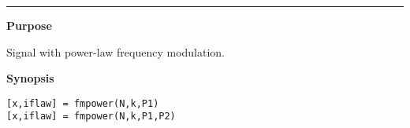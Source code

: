 


\hspace*{-1.6cm}{\Large \bf fmpower}

\vspace*{-.4cm}
\hspace*{-1.6cm}\rule[0in]{16.5cm}{.02cm}
\vspace*{.2cm}



{\bf \large {}\selectfont Purpose}\\
\hspace*{1.5cm}
\begin{minipage}[t]{13.5cm}
Signal with power-law frequency modulation.
\end{minipage}
\vspace*{.5cm}


{\bf \large {}\selectfont Synopsis}\\
\hspace*{1.5cm}
\begin{minipage}[t]{13.5cm}
\begin{verbatim}
[x,iflaw] = fmpower(N,k,P1)
[x,iflaw] = fmpower(N,k,P1,P2)
\end{verbatim}
\end{minipage}
\vspace*{.5cm}


